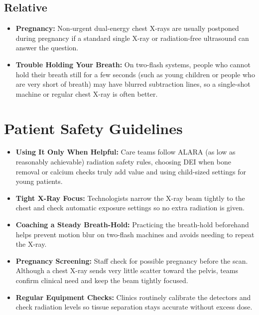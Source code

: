 \subsection{Relative}
\begin{itemize}
    \item \textbf{Pregnancy:} Non-urgent dual-energy chest X-rays are usually postponed during pregnancy if a standard single X-ray or radiation-free ultrasound can answer the question.
    \item \textbf{Trouble Holding Your Breath:} On two-flash systems, people who cannot hold their breath still for a few seconds (such as young children or people who are very short of breath) may have blurred subtraction lines, so a single-shot machine or regular chest X-ray is often better.
\end{itemize}

\section{Patient Safety Guidelines}
\begin{itemize}
    \item \textbf{Using It Only When Helpful:} Care teams follow ALARA (as low as reasonably achievable) radiation safety rules, choosing DEI when bone removal or calcium checks truly add value and using child-sized settings for young patients.
    \item \textbf{Tight X-Ray Focus:} Technologists narrow the X-ray beam tightly to the chest and check automatic exposure settings so no extra radiation is given.
    \item \textbf{Coaching a Steady Breath-Hold:} Practicing the breath-hold beforehand helps prevent motion blur on two-flash machines and avoids needing to repeat the X-ray.
    \item \textbf{Pregnancy Screening:} Staff check for possible pregnancy before the scan. Although a chest X-ray sends very little scatter toward the pelvis, teams confirm clinical need and keep the beam tightly focused.
    \item \textbf{Regular Equipment Checks:} Clinics routinely calibrate the detectors and check radiation levels so tissue separation stays accurate without excess dose.
\end{itemize}

